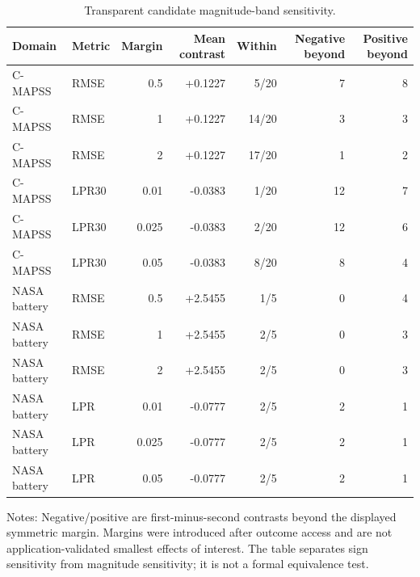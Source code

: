 \begin{table}[!t]
\centering
\caption{Transparent candidate magnitude-band sensitivity.}
\label{tab:candidate-magnitude-band}
\small
\begin{tabular}{llrrrrr}
\toprule
Domain & Metric & Margin & Mean contrast & Within & Negative beyond & Positive beyond \\
\midrule
C-MAPSS & RMSE & 0.5 & +0.1227 & 5/20 & 7 & 8 \\
C-MAPSS & RMSE & 1 & +0.1227 & 14/20 & 3 & 3 \\
C-MAPSS & RMSE & 2 & +0.1227 & 17/20 & 1 & 2 \\
C-MAPSS & LPR30 & 0.01 & -0.0383 & 1/20 & 12 & 7 \\
C-MAPSS & LPR30 & 0.025 & -0.0383 & 2/20 & 12 & 6 \\
C-MAPSS & LPR30 & 0.05 & -0.0383 & 8/20 & 8 & 4 \\
NASA battery & RMSE & 0.5 & +2.5455 & 1/5 & 0 & 4 \\
NASA battery & RMSE & 1 & +2.5455 & 2/5 & 0 & 3 \\
NASA battery & RMSE & 2 & +2.5455 & 2/5 & 0 & 3 \\
NASA battery & LPR & 0.01 & -0.0777 & 2/5 & 2 & 1 \\
NASA battery & LPR & 0.025 & -0.0777 & 2/5 & 2 & 1 \\
NASA battery & LPR & 0.05 & -0.0777 & 2/5 & 2 & 1 \\
\bottomrule
\end{tabular}
\begin{minipage}{0.98\linewidth}\footnotesize Notes: Negative/positive are first-minus-second contrasts beyond the displayed symmetric margin. Margins were introduced after outcome access and are not application-validated smallest effects of interest. The table separates sign sensitivity from magnitude sensitivity; it is not a formal equivalence test.\end{minipage}
\end{table}
